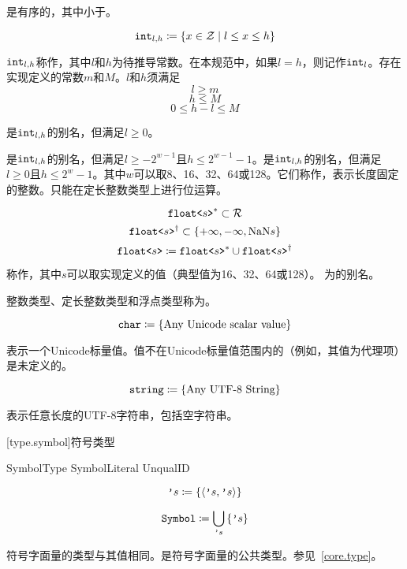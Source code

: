 \pnum
{}是有序的，其中小于。

$$\texttt{int}_{l,h} \coloneqq \{ x \in \mathcal{Z} \mid l \le x \le h \} $$

\pnum
$\texttt{int}_{l,h}$称作，其中$l$和$h$为待推导常数。在本规范中，如果$l = h$，则记作$\texttt{int}_l$。存在实现定义的常数$m$和$M$。$l$和$h$须满足
$$ l \ge m $$
$$ h \le M $$
$$ 0 \le h - l \le M $$

是$\texttt{int}_{l,h}$的别名，但满足$l\ge0$。

\pnum
{}是$\texttt{int}_{l,h}$的别名，但满足$l\ge-2^{w-1}$且$h\le2^{w-1}-1$。是$\texttt{int}_{l,h}$的别名，但满足$l\ge0$且$h\le2^w-1$。其中$w$可以取8、16、32、64或128。它们称作，表示长度固定的整数。只能在定长整数类型上进行位运算。

$$ \texttt{float<}s\texttt{>}^\ast \subset \mathcal{R} $$
$$ \texttt{float<}s\texttt{>}^\dagger \subset \{ +\infty, -\infty, \mathrm{NaN}s \} $$
$$ \texttt{float<}s\texttt{>} \coloneqq \texttt{float<}s\texttt{>}^\ast \cup \texttt{float<}s\texttt{>}^\dagger $$

\pnum
{}称作，其中$s$可以取实现定义的值（典型值为16、32、64或128）。
为的别名。

\pnum
整数类型、定长整数类型和浮点类型称为。

$$\texttt{char} \coloneqq \left\{ \textnormal{Any Unicode scalar value} \right\}$$

\pnum
{}表示一个Unicode标量值。值不在Unicode标量值范围内的（例如，其值为代理项）是未定义的。

$$\texttt{string} \coloneqq \left\{ \textnormal{Any UTF-8 String} \right\} $$

\pnum
{}表示任意长度的UTF-8字符串，包括空字符串。

[type.symbol]{符号类型}

\begin{bnf}{SymbolType}
    SymbolLiteral \br
     UnqualID \terminal{)}
\end{bnf}

$$ \texttt{'}s \coloneqq \left\{ \langle \texttt{'}s, \texttt{'}s \rangle \right\} $$

$$ \texttt{Symbol} \coloneqq \bigcup_{\texttt{'}s} \left\{  \texttt{'}s \right\} $$

\pnum
符号字面量的类型与其值相同。是符号字面量的公共类型。参见~\ref{core.type}。

